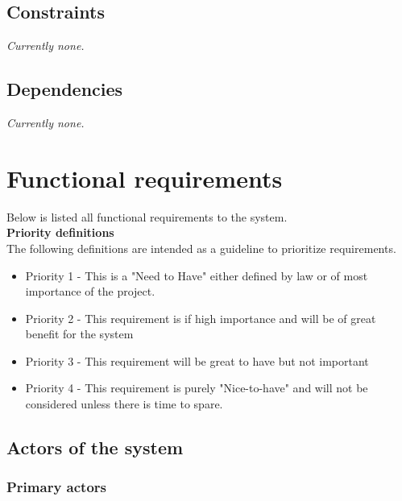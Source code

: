\subsection{Constraints}
\textit{Currently none.}
\subsection{Dependencies}
\textit{Currently none.}



\section{Functional requirements}
Below is listed all functional requirements to the system.\\
\textbf{\large{Priority definitions}}\\
The following definitions are intended as a guideline to prioritize requirements.
\begin{itemize}[noitemsep,nolistsep]
\item Priority 1 - This is a "Need to Have" either defined by law or of most importance of the project.
\item Priority 2 - This requirement is if high importance and will be of great benefit for the system
\item Priority 3 - This requirement will be great to have but not important
\item Priority 4 - This requirement is purely "Nice-to-have" and will not be considered unless there is time to spare.
\end{itemize}


\subsection{Actors of the system}

\subsubsection{Primary actors}


